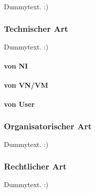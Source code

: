 Dummytext. :)


\subsubsection*{Technischer Art}
\label{subsubsec:gefahren_virt_technisch}
Dummytext. :)

\paragraph{von NI}
\label{parag:vonNI}

\paragraph{von VN/VM}
\label{parag:vonVN}

\paragraph{von User}
\label{parag:vonUser}



\subsubsection*{Organisatorischer Art}
\label{subsubsec:gefahren_virt_organisatorisch}
Dummytext. :)

\subsubsection*{Rechtlicher Art}
\label{subsubsec:gefahren_virt_rechtlich}
Dummytext. :)
